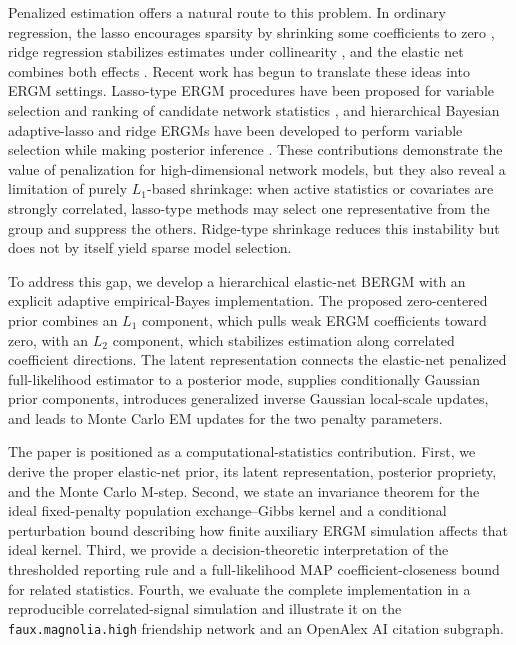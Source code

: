 \documentclass[preprint,12pt,authoryear]{elsarticle}
\begin{document}
Penalized estimation offers a natural route to this problem. In ordinary regression, the lasso encourages sparsity by shrinking some coefficients to zero \cite{tibshirani1996regression}, ridge regression stabilizes estimates under collinearity \citep{hoerl1970ridge}, and the elastic net combines both effects \citep{zou2005regularization}. Recent work has begun to translate these ideas into ERGM settings. Lasso-type ERGM procedures have been proposed for variable selection and ranking of candidate network statistics \citep{ButtazzoKauermann2026}, and hierarchical Bayesian adaptive-lasso and ridge ERGMs have been developed to perform variable selection while making posterior inference \citep{modisette2023penalized, Han2024adaptiveLasso}. These contributions demonstrate the value of penalization for high-dimensional network models, but they also reveal a limitation of purely \(L_1\)-based shrinkage: when active statistics or covariates are strongly correlated, lasso-type methods may select one representative from the group and suppress the others. Ridge-type shrinkage reduces this instability but does not by itself yield sparse model selection.

To address this gap, we develop a hierarchical elastic-net BERGM with an
explicit adaptive empirical-Bayes implementation. The proposed zero-centered
prior combines an \(L_1\) component, which pulls weak ERGM coefficients toward
zero, with an \(L_2\) component, which stabilizes estimation along correlated
coefficient directions. The latent representation connects the elastic-net
penalized full-likelihood estimator to a posterior mode, supplies conditionally
Gaussian prior components, introduces generalized inverse Gaussian local-scale
updates, and leads to Monte Carlo EM updates for the two penalty parameters.

The paper is positioned as a computational-statistics contribution. First, we
derive the proper elastic-net prior, its latent representation, posterior
propriety, and the Monte Carlo M-step. Second, we state an invariance theorem for
the ideal fixed-penalty population exchange--Gibbs kernel and a conditional
perturbation bound describing how finite auxiliary ERGM simulation affects that
ideal kernel. Third, we provide a decision-theoretic interpretation of the
thresholded reporting rule and a full-likelihood MAP coefficient-closeness
bound for related statistics. Fourth, we evaluate the complete implementation
in a reproducible correlated-signal simulation and illustrate it on the
\texttt{faux.magnolia.high} friendship network and an OpenAlex AI citation
subgraph.
\end{document}
